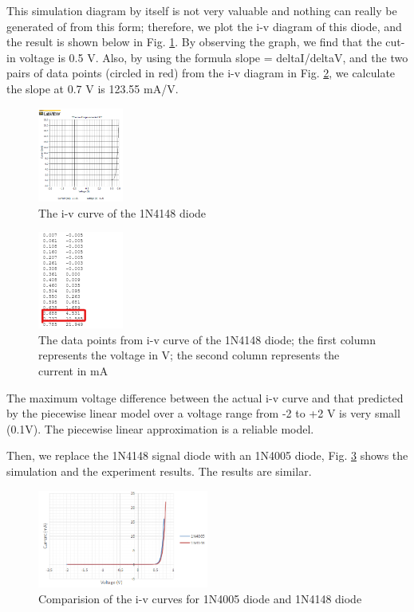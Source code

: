 \documentclass[letterpaper, 10 pt, conference]{ieeeconf}  %
\begin{document}
\par This simulation diagram by itself is not very valuable and nothing can really be generated of from this form; therefore, we plot the i-v diagram of this diode, and the result is shown below in Fig. \ref{fig:4}. By observing the graph, we find that the cut-in voltage is 0.5 V. Also, by using the formula slope = deltaI/deltaV, and the two pairs of data points (circled in red) from the i-v diagram in Fig. \ref{fig:5}, we calculate the slope at 0.7 V is 123.55 mA/V.
\begin{figure}[ht]
  \centering
  \includegraphics[width=0.25\textwidth]{images/result3.png}
  \caption{The i-v curve of the 1N4148 diode}
  \label{fig:4}
\end{figure}
\begin{figure}[ht]
  \centering
  \includegraphics[width=0.25\textwidth]{images/result4.png}
  \caption{The data points from i-v curve of the 1N4148 diode; the first column represents the voltage in V; the second column represents the current in mA}
  \label{fig:5}
\end{figure}
\par The maximum voltage difference between the actual i-v curve and that predicted by the piecewise linear model over a voltage range from -2 to +2 V is very small (0.1V). The piecewise linear approximation is a reliable model.
\par Then, we replace the 1N4148 signal diode with an 1N4005 diode, Fig. \ref{fig:6} shows the simulation and the experiment results. The results are similar.
\begin{figure}[ht]
  \centering
  \includegraphics[width=0.5\textwidth]{images/result5.png}
  \caption{Comparision of the i-v curves for 1N4005 diode and 1N4148 diode}
  \label{fig:6}
\end{figure}
\end{document}
